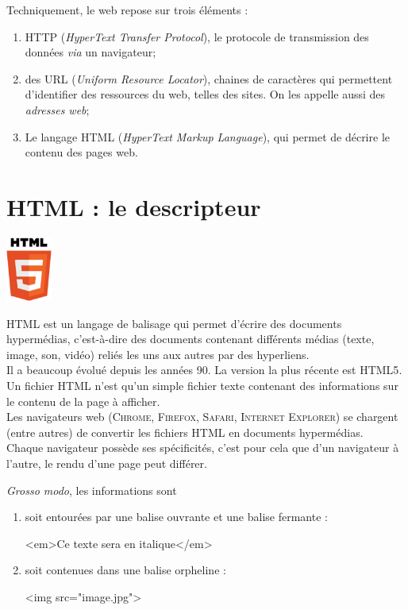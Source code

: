 \documentclass[a4paper,12pt,french]{book}
\begin{document}
Techniquement, le web repose sur trois éléments :
\begin{enumerate}[--]
	\item	\textsc{HTTP} (\textit{HyperText Transfer Protocol}), le protocole de transmission des données \textit{via} un navigateur;
	\item 	des \textsc{URL} (\textit{Uniform Resource Locator}), chaines de caractères qui permettent d'identifier des ressources du web, telles des 
	sites. On les appelle aussi des \textit{adresses web};
	\item 	Le langage \textsc{HTML} (\textit{HyperText Markup Language}), qui permet de décrire le contenu des pages web.
\end{enumerate}

\section{\textsc{HTML} : le descripteur}
	\begin{center}
		\includegraphics[width=1.5cm]{img/html}
	\end{center}
	\textsc{HTML}  est un langage de balisage qui permet d'écrire des documents hypermédias, c'est-à-dire des documents contenant différents médias 
	(texte, image, son, vidéo) reliés les uns aux autres par des hyperliens.\\
	Il a beaucoup évolué depuis les années 90. La version la plus récente est \textsc{HTML5}.\\
	Un fichier \textsc{HTML} n'est qu'un simple fichier texte contenant des informations sur le contenu de la page à afficher.\\
	Les navigateurs web (\textsc{Chrome, Firefox, Safari, Internet Explorer}) se chargent (entre autres) de convertir les fichiers 
	\textsc{HTML} en documents hypermédias.\\
	Chaque navigateur possède ses spécificités, c'est pour cela que d'un navigateur à l'autre, le rendu d'une page peut différer.

	\textit{Grosso modo}, les informations sont

	\begin{enumerate}[--]
		\item 	soit entourées par une balise ouvrante et une balise fermante :
\begin{html}
<em>Ce texte sera en italique</em>
\end{html}
		\item 	soit contenues dans une balise orpheline :
\begin{html}
<img src="image.jpg">
\end{html}
	\end{enumerate}
\end{document}
